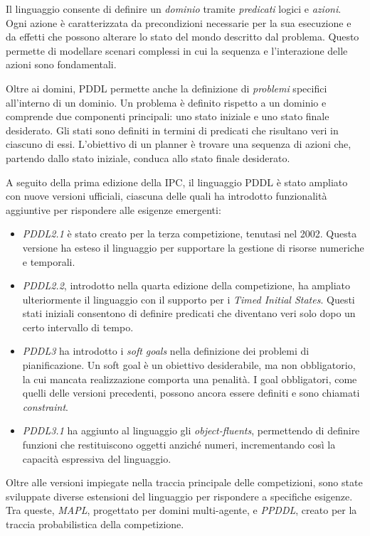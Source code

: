 \documentclass[a4paper, 11pt, titlepage, twoside, openany]{book}
\begin{document}
Il linguaggio consente di definire un \textit{dominio} tramite \textit{predicati} logici e \textit{azioni}. Ogni azione è caratterizzata da precondizioni necessarie per la sua esecuzione e da effetti che possono alterare lo stato del mondo descritto dal problema. Questo permette di modellare scenari complessi in cui la sequenza e l'interazione delle azioni sono fondamentali.

Oltre ai domini, PDDL permette anche la definizione di \textit{problemi} specifici all'interno di un dominio. Un problema è definito rispetto a un dominio e comprende due componenti principali: uno stato iniziale e uno stato finale desiderato. Gli stati sono definiti in termini di predicati che risultano veri in ciascuno di essi. L'obiettivo di un planner è trovare una sequenza di azioni che, partendo dallo stato iniziale, conduca allo stato finale desiderato.

A seguito della prima edizione della IPC, il linguaggio PDDL è stato ampliato con nuove versioni ufficiali, ciascuna delle quali ha introdotto funzionalità aggiuntive per rispondere alle esigenze emergenti:

\begin{itemize}
\item \textit{PDDL2.1}\cite{PDDL2.1} è stato creato per la terza competizione, tenutasi nel 2002. Questa versione ha esteso il linguaggio per supportare la gestione di risorse numeriche e temporali.
\item \textit{PDDL2.2}\cite{PDDL2.2}, introdotto nella quarta edizione della competizione, ha ampliato ulteriormente il linguaggio con il supporto per i \textit{Timed Initial States}. Questi stati iniziali consentono di definire predicati che diventano veri solo dopo un certo intervallo di tempo.
\item \textit{PDDL3}\cite{PDDL3} ha introdotto i \textit{soft goals} nella definizione dei problemi di pianificazione. Un soft goal è un obiettivo desiderabile, ma non obbligatorio, la cui mancata realizzazione comporta una penalità. I goal obbligatori, come quelli delle versioni precedenti, possono ancora essere definiti e sono chiamati \textit{constraint}.
\item \textit{PDDL3.1}\cite{PDDL3.1} ha aggiunto al linguaggio gli \textit{object-fluents}, permettendo di definire funzioni che restituiscono oggetti anziché numeri, incrementando così la capacità espressiva del linguaggio.
\end{itemize}

Oltre alle versioni impiegate nella traccia principale delle competizioni, sono state sviluppate diverse estensioni del linguaggio per rispondere a specifiche esigenze. Tra queste, \textit{MAPL}\cite{MAPL}, progettato per domini multi-agente, e \textit{PPDDL}\cite{PPDDL2}, creato per la traccia probabilistica della competizione. 
\end{document}
